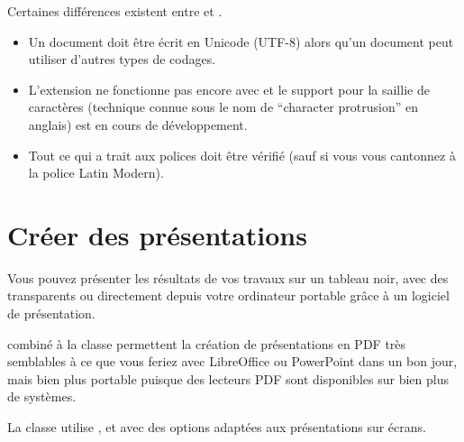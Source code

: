 Certaines différences existent entre  et
.

\begin{itemize}
\item Un document  doit être écrit en Unicode (UTF-8)
  alors qu'un document  peut utiliser d'autres types
  de codages.
\item L'extension  ne fonctionne pas encore avec
   et le support pour la saillie de caractères
  (technique connue sous le nom de \enquote{character protrusion} en
  anglais) est en cours de développement.
\item Tout ce qui a trait aux polices doit être vérifié (sauf si vous
  vous cantonnez à la police Latin Modern).
\end{itemize}


\section{Créer des présentations}
\label{sec:beamer}
Vous pouvez présenter les résultats de vos travaux sur un tableau
noir, avec des transparents ou directement depuis votre ordinateur
portable grâce à un logiciel de présentation.

 combiné à la classe  permettent la création
de présentations en PDF très semblables à ce que vous feriez avec
LibreOffice ou PowerPoint dans un bon jour, mais bien plus portable
puisque des lecteurs PDF sont disponibles sur bien plus de systèmes.

La classe  utilise ,  et
 avec des options adaptées aux présentations sur
écrans.



